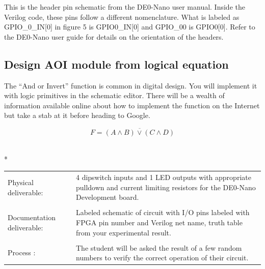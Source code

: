         This is the header pin schematic from the DE0-Nano user manual. Inside the Verilog code, these pins follow a different nomenclature. What is labeled as GPIO\_0\_IN[0] in figure 5 is GPIO0\_IN[0] and GPIO\_00 is GPIO0[0]. Refer to the DE0-Nano user guide for details on the orientation of the headers.        

      \subsection{Design AOI module from logical equation} 
        The ``And or Invert'' function is common in digital design. You will implement it with logic primitives in the schematic editor. There will be a wealth of information available online about how to implement the function on the Internet but take a stab at it before heading to Google.

      \begin{displaymath}
        F = \overline{(A \wedge B) \vee (C \wedge D)}
      \end{displaymath}

      \vspace{15px}
      \begin{centering}
        \begin{fminipage}{.43\textwidth}
          \vspace{3px}
          \\*
          \vspace{10px}
          \begin{tabular}{p{1.8cm}  p{5.4cm}}
            \raggedright Physical deliverable:        &4 dipswitch inputs and 1 LED outputs with appropriate pulldown and current limiting resistors for the DE0-Nano Development board. \\
            \\
            \raggedright Documentation deliverable:   & Labeled schematic of circuit with I/O pins labeled with FPGA pin number and Verilog net name,  truth table from your  experimental result.\\
            \\
            Process :                                 &The student will be asked the result of a few random numbers to verify the correct operation of their circuit.
          \end{tabular}
        \end{fminipage}
      \end{centering}

